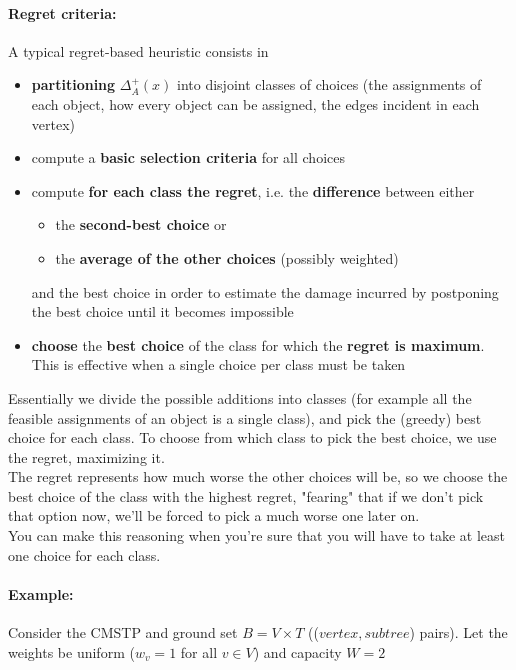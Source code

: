 \paragraph{Regret criteria:} A typical regret-based heuristic consists in
\begin{itemize}
	\item \textbf{partitioning} $\Delta_A^+ (x)$ into disjoint classes of choices (the assignments of each object, how every object can be assigned, the edges incident in each vertex)
	
	\item compute a \textbf{basic selection criteria} for all choices
	
	\item compute \textbf{for each class the regret}, i.e. the \textbf{difference} between either
	\begin{itemize}
		\item the \textbf{second-best choice} or
		\item the \textbf{average of the other choices} (possibly weighted)
	\end{itemize}
	and the best choice in order to estimate the damage incurred by postponing the best choice until it becomes impossible
	
	\item \textbf{choose} the \textbf{best choice} of the class for which the \textbf{regret is maximum}. This is effective when a single choice per class must be taken
\end{itemize}

Essentially we divide the possible additions into classes (for example all the feasible assignments of an object is a single class), and pick the (greedy) best choice for each class. To choose from which class to pick the best choice, we use the regret, maximizing it.\\

The regret represents how much worse the other choices will be, so we choose the best choice of the class with the highest regret, "fearing" that if we don't pick that option now, we'll be forced to pick a much worse one later on. \\

You can make this reasoning when you're sure that you will have to take at least one choice for each class.\\

\paragraph{Example:} Consider the CMSTP and ground set $B = V \times T$ (($vertex,subtree$) pairs). Let the weights be uniform ($w_v = 1$ for all $v \in V$) and capacity $W = 2$

